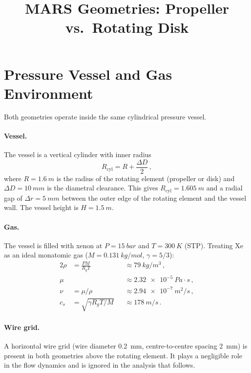 \documentclass[11pt,a4paper]{article}
\title{MARS Geometries: Propeller vs.\ Rotating Disk}
\author{}
\date{}
\begin{document}
\maketitle
\tableofcontents
\newpage

\section{Pressure Vessel and Gas Environment}
\label{sec:vessel}

Both geometries operate inside the same cylindrical pressure vessel.

\paragraph{Vessel.}
The vessel is a vertical cylinder with inner radius
\begin{equation}
  R_\mathrm{cyl} = R + \frac{\Delta D}{2}\,,
\end{equation}
where $R = \SI{1.6}{m}$ is the radius of the rotating element
(propeller or disk) and $\Delta D = \SI{10}{mm}$ is the diametral
clearance. This gives $R_\mathrm{cyl} = \SI{1.605}{m}$ and a radial
gap of $\Delta r = \SI{5}{mm}$ between the outer edge of the rotating
element and the vessel wall. The vessel height is $H = \SI{1.5}{m}$.

\paragraph{Gas.}
The vessel is filled with xenon at $P = \SI{15}{bar}$ and
$T = \SI{300}{K}$ (STP). Treating Xe as an ideal monatomic gas
($M = \SI{0.131}{kg/mol}$, $\gamma = 5/3$):
\begin{alignat}{2}
  \rho  &= \frac{PM}{R_g T}
        &&\approx \SI{79}{kg/m^3}\,,
  \label{eq:rho}
  \\[4pt]
  \mu   &
        &&\approx \SI{2.32e-5}{Pa\cdot s}\,,
  \\[4pt]
  \nu   &= \mu/\rho
        &&\approx \SI{2.94e-7}{m^2/s}\,,
  \\[4pt]
  c_s   &= \sqrt{\gamma R_g T / M}
        &&\approx \SI{178}{m/s}\,.
\end{alignat}

\paragraph{Wire grid.}
A horizontal wire grid (wire diameter \SI{0.2}{mm}, centre-to-centre
spacing \SI{2}{mm}) is present in both geometries above the rotating
element. It plays a negligible role in the flow dynamics and is ignored
in the analysis that follows.
\end{document}
